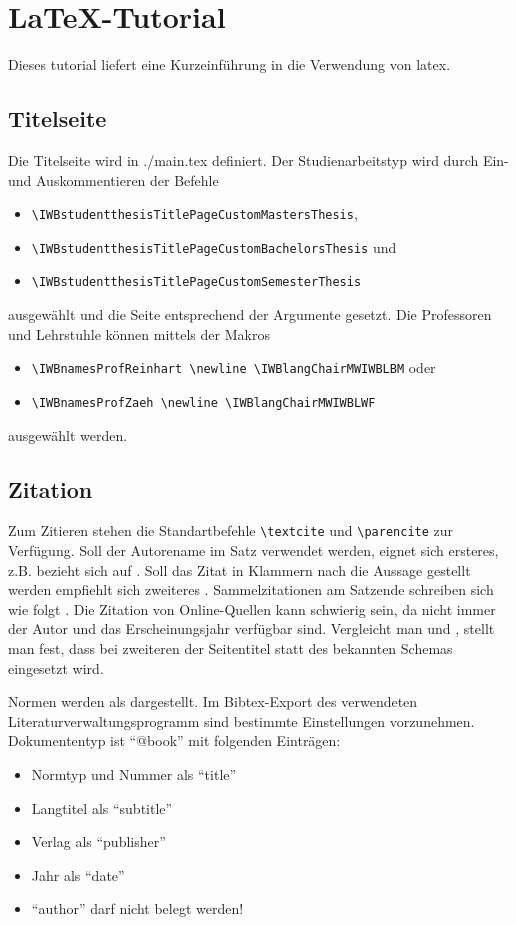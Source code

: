 \chapter{LaTeX-Tutorial}%
Dieses \gls{tutorial} liefert eine Kurzeinführung\cite{Kleinwort2018658} in die Verwendung von \gls{latex}.%
%
\section{Titelseite}%
Die Titelseite wird in {./main.tex} definiert. Der Studienarbeitstyp wird durch Ein- und Auskommentieren der Befehle%
\begin{itemize}%
	\item \verb|\IWBstudentthesisTitlePageCustomMastersThesis|,%
	\item \verb|\IWBstudentthesisTitlePageCustomBachelorsThesis| und%
	\item \verb|\IWBstudentthesisTitlePageCustomSemesterThesis|%
\end{itemize}%
ausgewählt und die Seite entsprechend der Argumente gesetzt. Die Professoren und Lehrstuhle können mittels der Makros%
\begin{itemize}%
	\item \verb|\IWBnamesProfReinhart \newline \IWBlangChairMWIWBLBM| oder%
	\item \verb|\IWBnamesProfZaeh \newline \IWBlangChairMWIWBLWF|%
\end{itemize}%
ausgewählt werden.%
%
\section{Zitation}%
%
Zum Zitieren stehen die Standartbefehle \verb|\textcite| und \verb|\parencite| zur Verfügung. Soll der Autorename im Satz verwendet werden, eignet sich ersteres, z.B. \textcite[2-3]{Bayerlein2018} bezieht sich auf \textcite{Bayerlein2016469}. Soll das Zitat in Klammern nach die Aussage gestellt werden empfiehlt sich zweiteres \parencite{Zaeh2018385}. Sammelzitationen am Satzende schreiben sich wie folgt \parencite{Kleinwort2018658,Kleinwort20189,Kleinwort2018631}. Die Zitation von Online-Quellen kann schwierig sein, da nicht immer der Autor und das Erscheinungsjahr verfügbar sind. Vergleicht man \textcite{Heuss2018} und \textcite{iwb-Startseite}, stellt man fest, dass bei zweiteren der Seitentitel statt des bekannten Schemas eingesetzt wird.\par%
%
Normen werden als \textcite{ISO.10218-2} dargestellt. Im Bibtex-Export des verwendeten Literaturverwaltungsprogramm sind bestimmte Einstellungen vorzunehmen. Dokumententyp ist \enquote{@book} mit folgenden Einträgen:
\begin{itemize}
	\item Normtyp und Nummer als \enquote{title}
	\item Langtitel als \enquote{subtitle}
	\item Verlag als \enquote{publisher}
	\item Jahr als \enquote{date}
	\item \enquote{author} darf nicht belegt werden!
\end{itemize}
%

